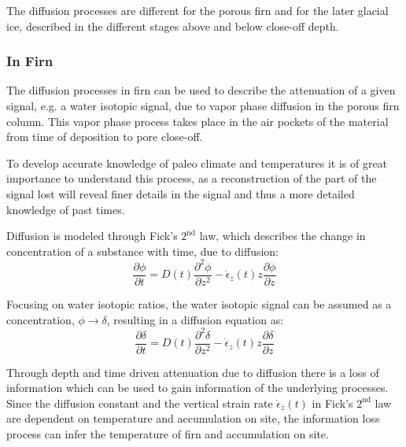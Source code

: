 \documentclass[../../CompleteThesis2/Complete_2ndDraft]{subfiles}
\begin{document}
The diffusion processes are different for the porous firn and for the later glacial ice, described in the different stages above and below close-off depth.

\subsubsection{In Firn}
\label{Subsubsec:Ice_DiffusionAndDensification_Diffusion_Firn}
The diffusion processes in firn can be used to describe the attenuation of a given signal, e.g. a water isotopic signal, due to vapor phase diffusion in the porous firn column. This vapor phase process takes place in the air pockets of the material from time of deposition to pore close-off. 

To develop accurate knowledge of paleo climate and temperatures it is of great importance to understand this process, as a reconstruction of the part of the signal lost will reveal finer details in the signal and thus a more detailed knowledge of past times. 

Diffusion is modeled through Fick's $2^{\text{nd}}$ law, which describes the change in concentration of a substance with time, due to diffusion:
\begin{equation}
	\frac{\partial \phi}{\partial t} = D(t) \frac{\partial^2 \phi}{\partial z^2} - \dot{\epsilon}_z(t) z \frac{\partial \phi}{\partial z}
	\label{Eq:Fick2_concentration}
\end{equation}

Focusing on water isotopic ratios, the water isotopic signal can be assumed as a concentration, $\phi \rightarrow \delta$, resulting in a diffusion equation as:
\begin{equation}
	\frac{\partial \delta}{\partial t} = D(t) \frac{\partial^2 \delta}{\partial z^2} - \dot{\epsilon}_z(t) z \frac{\partial \delta}{\partial z}
	\label{Eq:Fick2_WIS}
\end{equation}

Through depth and time driven attenuation due to diffusion there is a loss of information which can be used to gain information of the underlying processes. Since the diffusion constant and the vertical strain rate $\dot{\epsilon}_z(t)$ in Fick's $2^{\text{nd}}$ law are dependent on temperature and accumulation on site, the information loss process can infer the temperature of firn and accumulation on site.
\end{document}
